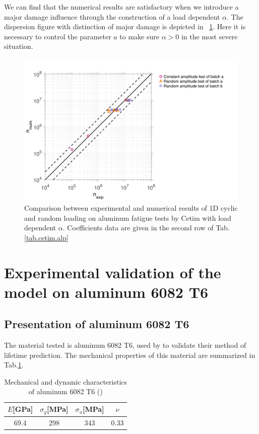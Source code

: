 \documentclass[3p,times,procedia,number]{elsarticle}
\newcommand{\figref}[1]{\figurename~\ref{#1}}
\begin{document}
We can find that the numerical results are satisfactory when we introduce a major damage influence through the construction of a load dependent $\alpha$. The dispersion figure with distinction of major damage is depicted in \figref{fig.Cetimerr}. Here it is necessary to control the parameter $a$ to make sure $\alpha>0$ in the most severe situation.

\begin{figure}[!h]
	\centering
	\includegraphics[width=\textwidth]{figures//Cetim_err.png} 
	\caption{Comparison between experimental and numerical results of 1D cyclic and random loading on aluminum fatigue tests by Cetim with load dependent $\alpha$. Coefficients data are given in the second row of Tab.\ref{tab.cetim.alp}}
	\label{fig.Cetimerr}
\end{figure}

\clearpage
\section{Experimental validation of the model on aluminum 6082 T6}
\subsection{Presentation of aluminum 6082 T6}

The material tested is aluminum 6082 T6, used by \cite{susmel2003multiaxial} to validate their method of lifetime prediction. The mechanical properties of this material are summarized in Tab.\ref{tab.al6082t6}.

\begin{table}[!h]
	\centering
	\begin{tabular}{|c|c|c|c|}
		\hline
		\textbf{$E${[}GPa{]}} & \textbf{$\sigma_{y}${[}MPa{]}} & \textbf{$\sigma_u${[}MPa{]}} & \textbf{$\nu$} \\ \hline
		69.4                                  & 298                                & 343                         & 0.33                 \\ \hline
	\end{tabular}
	\caption{Mechanical and dynamic characteristics of aluminum 6082 T6 (\cite{susmel2003multiaxial})}
	\label{tab.al6082t6}
\end{table}
\end{document}
